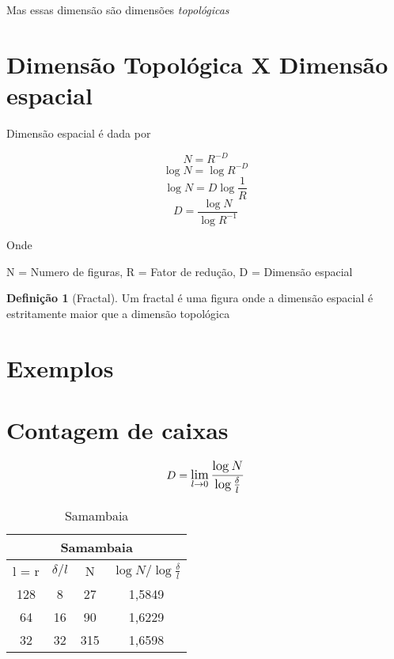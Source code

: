 \documentclass[12pt]{report}
\theoremstyle{definition}
\newtheorem{definition}{Definição}
\begin{document}
Mas essas dimensão são dimensões \textit{topológicas}

\section{Dimensão Topológica X Dimensão espacial}


Dimensão espacial é dada por

\[ N = R^{-D} \]
\[ \log{N} = \log{R^{-D}} \]
\[ \log{N} = D\log{\frac{1}{R}} \]
\begin{equation}
     D = \frac{\log{N}}{\log{R^{-1}}}
\end{equation}

Onde

N = Numero de figuras,
R = Fator de redução,
D = Dimensão espacial

\begin{definition}[Fractal]
\label{frac}
Um fractal é uma figura onde a dimensão espacial é estritamente maior que a dimensão topológica
\end{definition}

\section{Exemplos}
\section{Contagem de caixas}

\[ D = \mathlarger{
        \lim_{
            l\to0
            } 
        \frac{
            \log{N}
        }{
            \log{
                \frac{
                    \delta
                    }{
                    l
                }
            }
        }
    }  \]

\begin{table}[h]
    \centering
        \begin{tabular}{| c | c | c | c |}
             \multicolumn{4}{c}{Samambaia} \\
             \hline
             l = r & $\delta/l$ & N & $\log{N}/\log{\frac{\delta}{l}}$ \\
             \hline
             128 & 8 & 27 & 1,5849 \\
             \hline
             64 & 16 & 90 & 1,6229 \\
             \hline
             32 & 32 & 315 & 1,6598 \\
             \hline 
        \end{tabular}
    \caption{Samambaia}
    \label{tab:sam}
\end{table}
\end{document}
